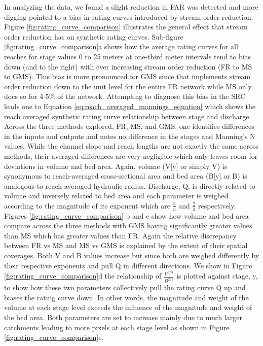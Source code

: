 In analyzing the data, we found a slight reduction in FAR was detected and more digging pointed to a bias in rating curves introduced by stream order reduction.
Figure \ref{fig:rating_curve_comparison} illustrates the general effect that stream order reduction has on synthetic rating curves.
Sub-figure \ref{fig:rating_curve_comparison}a shows how the average rating curves for all reaches for stage values 0 to 25 meters at one-third meter intervals tend to bias down (and to the right) with ever increasing stream order reduction (FR to MS to GMS). 
This bias is more pronounced for GMS since that implements stream order reduction down to the unit level for the entire FR network while MS only does so for 4-5\% of the network.
Attempting to diagnose this bias in the SRC leads one to Equation \ref{eq:reach_averaged_mannings_equation} which shows the reach averaged synthetic rating curve relationship between stage and discharge.
Across the three methods explored, FR, MS, and GMS, one identifies differences in the inputs and outputs and notes no difference in the stages and Manning's N values.
While the channel slope and reach lengths are not exactly the same across methods, their averaged differences are very negligible which only leaves room for deviations in volume and bed area.
Again, volume (V[y] or simply V) is synonymous to reach-averaged cross-sectional area and bed area (B[y] or B) is analogous to reach-averaged hydraulic radius.
Discharge, Q, is directly related to volume and inversely related to bed area and each parameter is weighed according to the magnitude of its exponent which are $\frac{5}{3}$ and $\frac{2}{3}$ respectively. 
Figures \ref{fig:rating_curve_comparison} b and c show how volume and bed area compare across the three methods with GMS having significantly greater values than MS which has greater values than FR.
Again the relative discrepancy between FR vs MS and MS vs GMS is explained by the extent of their spatial coverages.
Both V and B values increase but since both are weighed differently by their respective exponents and pull Q in different directions.
We show in Figure \ref{fig:rating_curve_comparison}d the relationship of $\frac{V^{5/3}}{B^{2/3}}$ is plotted against stage, y, to show how these two parameters collectively pull the rating curve Q up and biases the rating curve down.
In other words, the magnitude and weight of the volume at each stage level exceeds the influence of the magnitude and weight of the bed area.
Both parameters are set to increase mainly due to much larger catchments leading to more pixels at each stage level as shown in Figure \ref{fig:rating_curve_comparison}e.
